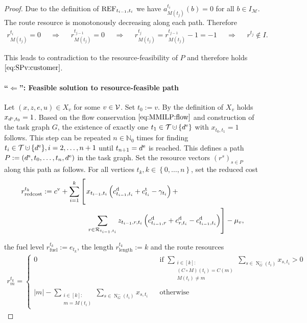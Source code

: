 \begin{proof}
Due to the definition of $\operatorname{REF}_{t_{i-1},t_i}$ we have ${a^{t_i}_{M\left(t_j\right)}(b) = 0}$ for all ${b\in I_{\mathcal{M}}}$. The route resource is monotonously decreasing along each path. Therefore
\begin{align*}
	r^{t_i}_{M\left(t_j\right)}=0 && \Rightarrow && r^{t_{j-1}}_{M\left(t_j\right)} = 0 && \Rightarrow && r^{t_j}_{M\left(t_j\right)} = r^{t_{j-1}}_{M\left(t_j\right)} - 1 = -1 && \Rightarrow && r^{t_j} \notin I.
\end{align*}

This leads to contradiction to the resource-feasibility of $P$ and therefore holds $\eqref{eq:SPv:customer}$.

\paragraph{\enquote{$\boldsymbol{\Leftarrow}$}: Feasible solution to resource-feasible path} \proofparfill

Let $(x,z,e,u)\in X_v$ for some $v\in\mathcal{V}$. Set ${t_0 := v}$. By the definition of $X_v$ holds ${x_{d^{\operatorname{s}},t_0} = 1}$. Based on the flow conservation $\eqref{eq:MMILP:flow}$ and construction of the task graph $G$, the existence of exactly one ${t_1\in\mathcal{T}\cupdot\left\{\de\right\}}$ with ${x_{t_0,t_1} = 1}$ follows. This step can be repeated ${n\in\mathbb{N}_0}$ times for finding ${t_i\in\mathcal{T}\cupdot\left\{\de\right\}}, {i = 2,\dots,n+1}$ until ${t_{n+1}=d^{\operatorname{e}}}$ is reached. This defines a path ${P:=\left(d^{\operatorname{s}},t_0,\dots,t_n,d^{\operatorname{e}}\right)}$ in the task graph. Set the resource vectors $\left(r^s\right)_{s\in P}$ along this path as follows. For all vertices $t_k, {k\in\left\{0,\dots,n\right\}}$, set the reduced cost
\begin{align*}
	r^{t_k}_{\operatorname{redcost}} := \cv + \sum_{i=1}^k\left[ \vphantom{\sum_{r\in\mathcal{R}_{t_{i-1}}}} \right. & x_{t_{i-1},t_i}\left(\cd_{t_{i-1},t_i}+\ct_{t_i}-\gamma_{t_i}\right) + \\
	& \left. \sum_{r\in\mathcal{R}_{t_{i-1},t_i}} z_{t_{i-1},r,t_i}\left(\cd_{t_{i-1},r}+\cd_{r,t_i}-\cd_{t_{i-1},t_i}\right)\right] - \mu_v,
\end{align*}

the fuel level ${r^{t_k}_{\operatorname{fuel}} := e_{t_k}}$, the length ${r^{t_k}_{\operatorname{length}} := k}$ and the route resources
\begin{align*}
	r^{t_k}_m = \left\{\begin{array}{ccl}
		0 && \displaystyle{\text{if } \sum_{ \substack{i\in[k]: \\ (C\circ M)\left(t_i\right) = C(m) \\ M\left(t_i\right) \neq m} } \sum_{s\in\operatorname{N}^-_{G}\left(t_i\right)} x_{s,t_i} > 0} \\ \\
		\displaystyle{\vert m\vert - \sum_{ \substack{i\in[k]: \\ m = M\left(t_i\right)} } \sum_{s\in\operatorname{N}^-_{G}\left(t_i\right)} x_{s,t_i}} && \text{otherwise}
	\end{array}\right.
\end{align*}


\end{proof}
